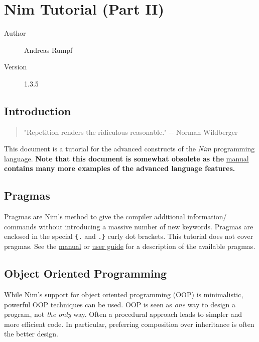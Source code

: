 \hypertarget{nim-tutorial-part-ii}{%
\section{Nim Tutorial (Part II)}\label{nim-tutorial-part-ii}}

\begin{description}
\item[Author]
Andreas Rumpf
\item[Version]
1.3.5
\end{description}

\hypertarget{introduction}{%
\subsection{Introduction}\label{introduction}}

\begin{quote}
"Repetition renders the ridiculous reasonable." -\/- Norman Wildberger
\end{quote}

This document is a tutorial for the advanced constructs of the
\emph{Nim} programming language. \textbf{Note that this document is
somewhat obsolete as the} \href{manual.html}{manual} \textbf{contains
many more examples of the advanced language features.}

\hypertarget{pragmas}{%
\subsection{Pragmas}\label{pragmas}}

Pragmas are Nim's method to give the compiler additional information/
commands without introducing a massive number of new keywords. Pragmas
are enclosed in the special \texttt{\{.} and \texttt{.\}} curly dot
brackets. This tutorial does not cover pragmas. See the
\href{manual.html\#pragmas}{manual} or
\href{nimc.html\#additional-features}{user guide} for a description of
the available pragmas.

\hypertarget{object-oriented-programming}{%
\subsection{Object Oriented
Programming}\label{object-oriented-programming}}

While Nim's support for object oriented programming (OOP) is
minimalistic, powerful OOP techniques can be used. OOP is seen as
\emph{one} way to design a program, not \emph{the only} way. Often a
procedural approach leads to simpler and more efficient code. In
particular, preferring composition over inheritance is often the better
design.

